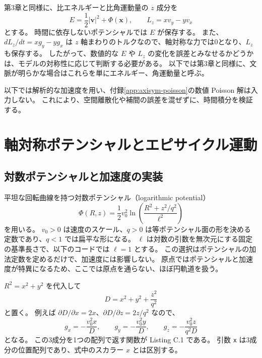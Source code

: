 第3章と同様に、比エネルギーと比角運動量の $z$ 成分を
\begin{equation}
 E=\frac12|\boldsymbol v|^2+\Phi(\boldsymbol x),\qquad
 L_z=xv_y-yv_x
\label{eq:appC-diagnostics}
\end{equation}
とする。
時間に依存しないポテンシャルでは $E$ が保存する。
また、$dL_z/dt=xg_y-yg_x$ は $z$ 軸まわりのトルクなので、軸対称な力では0となり、$L_z$ も保存する。
したがって、数値的な $E$ や $L_z$ の変化を誤差とみなせるかどうかは、モデルの対称性に応じて判断する必要がある。
以下では第3章と同様に、文脈が明らかな場合はこれらを単にエネルギー、角運動量と呼ぶ。

以下では解析的な加速度を用い、付録\ref{app:axisym-poisson}の数値 Poisson 解は入力しない。
これにより、空間離散化や補間の誤差を混ぜずに、時間積分を検証する。

\section{軸対称ポテンシャルとエピサイクル運動}
\label{sec:appC-axisymmetric}

\subsection{対数ポテンシャルと加速度の実装}

平坦な回転曲線を持つ対数ポテンシャル（logarithmic potential）
\begin{equation}
 \Phi(R,z)=\frac12v_0^2\ln\left(\frac{R^2+z^2/q^2}{\ell^2}\right)
\label{eq:appC-log-axisym}
\end{equation}
を用いる。
$v_0>0$ は速度のスケール、$q>0$ は等ポテンシャル面の形を決める定数であり、$q<1$ では扁平な形になる。
$\ell$ は対数の引数を無次元にする固定の基準長さで、以下のコードでは $\ell=1$ とする。
この選択はポテンシャルの加法定数を定めるだけで、加速度には影響しない。
原点ではポテンシャルと加速度が特異になるため、ここでは原点を通らない、ほぼ円軌道を扱う。

$R^2=x^2+y^2$ を代入して
\begin{equation}
 D=x^2+y^2+\frac{z^2}{q^2}
\end{equation}
と置く。
例えば $\partial D/\partial x=2x$、$\partial D/\partial z=2z/q^2$ なので、
\begin{equation}
 g_x=-\frac{v_0^2x}{D},\qquad
 g_y=-\frac{v_0^2y}{D},\qquad
 g_z=-\frac{v_0^2z}{q^2D}
\label{eq:appC-log-acceleration}
\end{equation}
となる。
この3成分を1つの配列で返す関数が Listing C.1 である。
引数 \texttt{x} は3成分の位置配列であり、式中のスカラー $x$ とは区別する。

